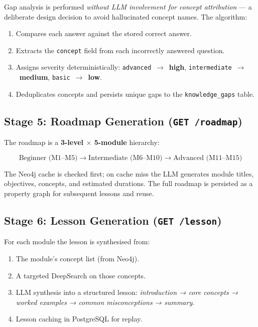 \documentclass[12pt,a4paper]{article}
\begin{document}
Gap analysis is performed \emph{without LLM involvement for concept
attribution} — a deliberate design decision to avoid hallucinated concept
names. The algorithm:

\begin{enumerate}
  \item Compares each answer against the stored correct answer.
  \item Extracts the \texttt{concept} field from each incorrectly answered question.
  \item Assigns severity deterministically: \texttt{advanced}~$\to$~\textbf{high},
    \texttt{intermediate}~$\to$~\textbf{medium}, \texttt{basic}~$\to$~\textbf{low}.
  \item Deduplicates concepts and persists unique gaps to the
    \texttt{knowledge\_gaps} table.
\end{enumerate}

\subsection{Stage 5: Roadmap Generation (\texttt{GET /roadmap})}

The roadmap is a \textbf{3-level $\times$ 5-module} hierarchy:

\[
  \text{Beginner (M1--M5)} \to \text{Intermediate (M6--M10)} \to
  \text{Advanced (M11--M15)}
\]

The Neo4j cache is checked first; on cache miss the LLM generates module
titles, objectives, concepts, and estimated durations. The full roadmap is
persisted as a property graph for subsequent lessons and reuse.

\subsection{Stage 6: Lesson Generation (\texttt{GET /lesson})}

For each module the lesson is synthesised from:

\begin{enumerate}
  \item The module's concept list (from Neo4j).
  \item A targeted DeepSearch on those concepts.
  \item LLM synthesis into a structured lesson:
    \emph{introduction → core concepts → worked examples →
    common misconceptions → summary}.
  \item Lesson caching in PostgreSQL for replay.
\end{enumerate}
\end{document}
